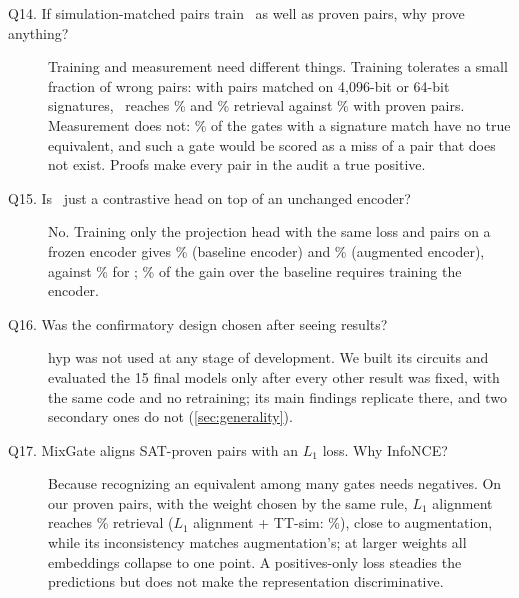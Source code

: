 \begin{description}
\item[Q14. If simulation-matched pairs train \ours\ as well as proven pairs, why prove anything?] Training and
measurement need different things. Training tolerates a small fraction of wrong pairs: with pairs matched on
4{,}096-bit or 64-bit signatures, \ours\ reaches \SigFourKTop\% and \SigSixtyFourTop\% retrieval against
\OursTopRS\% with proven pairs. Measurement does not: \SigFalsePct\% of the gates with a signature match have no
true equivalent, and such a gate would be scored as a miss of a pair that does not exist. Proofs make every pair in
the audit a true positive.

\item[Q15. Is \ours\ just a contrastive head on top of an unchanged encoder?] No. Training only the projection head
with the same loss and pairs on a frozen encoder gives \ProbeBaseTop\% (baseline encoder) and \ProbeAugTop\%
(augmented encoder), against \OursTopRS\% for \ours; \EncShare\% of the gain over the baseline requires training the
encoder.

\item[Q16. Was the confirmatory design chosen after seeing results?] hyp was not used at any stage of development.
We built its circuits and evaluated the 15 final models only after every other result was fixed, with the same
code and no retraining; its main findings replicate there, and two secondary ones do not (\cref{sec:generality}).

\item[Q17. MixGate aligns SAT-proven pairs with an $L_1$ loss. Why InfoNCE?] Because recognizing an equivalent among
many gates needs negatives. On our proven pairs, with the weight chosen by the same rule, $L_1$ alignment reaches
\LoneTop\% retrieval ($L_1$ alignment + TT-sim: \LonettTop\%), close to augmentation, while its inconsistency matches
augmentation's; at larger weights all embeddings collapse to one point. A positives-only loss steadies the
predictions but does not make the representation discriminative.
\end{description}
